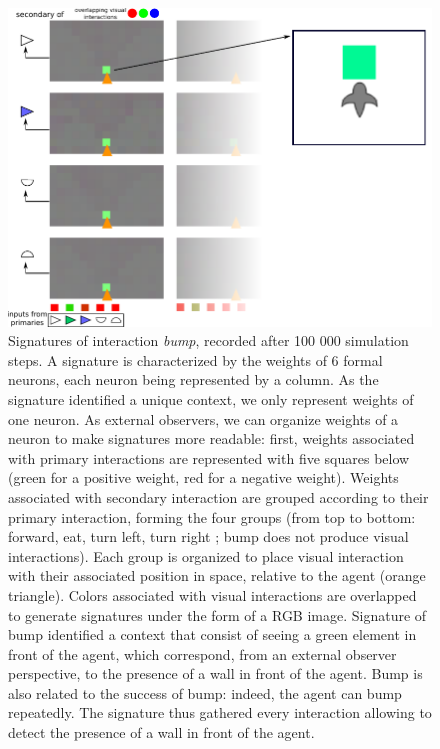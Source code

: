 \documentclass[conference]{IEEEtran}
\begin{document}
\begin{figure}[htbp]
\centerline{\includegraphics[scale=0.5]{img/Signatures1_3.pdf}}
\caption{Signatures of interaction \textit{bump}, recorded after 100 000 simulation steps. A signature is characterized by the weights of 6 formal neurons, each neuron being represented by a column. As the signature identified a unique context, we only represent weights of one neuron. As external observers, we can organize weights of a neuron to make signatures more readable: first, weights associated with primary interactions are represented with five squares below (green for a positive weight, red for a negative weight). Weights associated with secondary interaction are grouped according to their primary interaction, forming the four groups (from top to bottom: forward, eat, turn left, turn right ; bump does not produce visual interactions). Each group is organized to place visual interaction with their associated position in space, relative to the agent (orange triangle). Colors associated with visual interactions are overlapped to generate signatures under the form of a RGB image. Signature of bump identified a context that consist of seeing a green element in front of the agent, which correspond, from an external observer perspective, to the presence of a wall in front of the agent. Bump is also related to the success of bump: indeed, the agent can bump repeatedly. The signature thus gathered every interaction allowing to detect the presence of a wall in front of the agent.}
\label{fig}
\end{figure}
\end{document}
